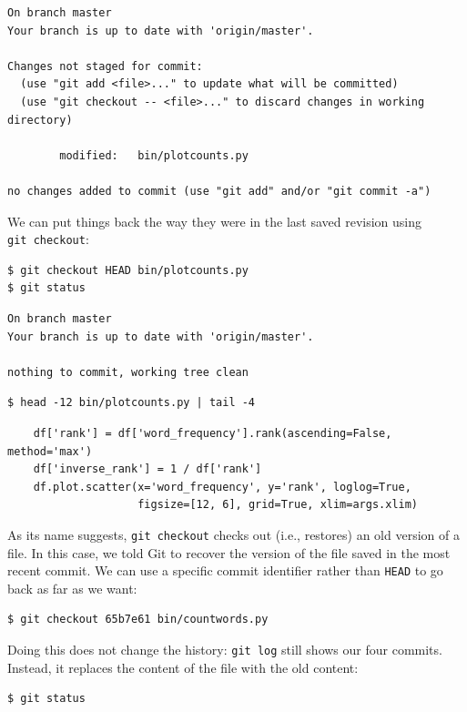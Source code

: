 \documentclass[
]{krantz}
\begin{document}
\begin{verbatim}
On branch master
Your branch is up to date with 'origin/master'.

Changes not staged for commit:
  (use "git add <file>..." to update what will be committed)
  (use "git checkout -- <file>..." to discard changes in working directory)

        modified:   bin/plotcounts.py

no changes added to commit (use "git add" and/or "git commit -a")
\end{verbatim}

We can put things back the way they were in the last saved revision using \texttt{git\ checkout}:

\begin{verbatim}
$ git checkout HEAD bin/plotcounts.py
$ git status
\end{verbatim}

\begin{verbatim}
On branch master
Your branch is up to date with 'origin/master'.

nothing to commit, working tree clean
\end{verbatim}

\begin{verbatim}
$ head -12 bin/plotcounts.py | tail -4
\end{verbatim}

\begin{verbatim}
    df['rank'] = df['word_frequency'].rank(ascending=False, method='max')
    df['inverse_rank'] = 1 / df['rank']
    df.plot.scatter(x='word_frequency', y='rank', loglog=True,
                    figsize=[12, 6], grid=True, xlim=args.xlim)
\end{verbatim}

As its name suggests,
\texttt{git\ checkout} checks out (i.e., restores) an old version of a file.
In this case,
we told Git to recover the version of the file saved in the most recent commit.
We can use a specific commit identifier rather than \texttt{HEAD} to go back as far as we want:

\begin{verbatim}
$ git checkout 65b7e61 bin/countwords.py
\end{verbatim}

Doing this does not change the history:
\texttt{git\ log} still shows our four commits.
Instead,
it replaces the content of the file with the old content:

\begin{verbatim}
$ git status
\end{verbatim}
\end{document}
